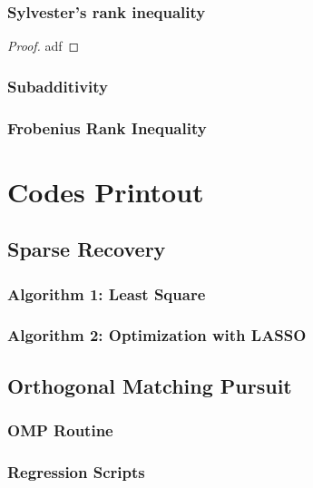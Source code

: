 \documentclass[11pt,a4paper]{report}
\begin{document}
\subsection{Sylvester's rank inequality}
\begin{proof}
    adf    
\end{proof}

\subsection{Subadditivity}

\subsection{Frobenius Rank Inequality}

\newpage
\appendix
\chapter{Codes Printout}

\section{Sparse Recovery}
\subsection{Algorithm 1: Least Square}

\newpage
\subsection{Algorithm 2: Optimization with LASSO}

\newpage

\section{Orthogonal Matching Pursuit}

\subsection{OMP Routine}


\newpage
\subsection{Regression Scripts}


\end{document}
